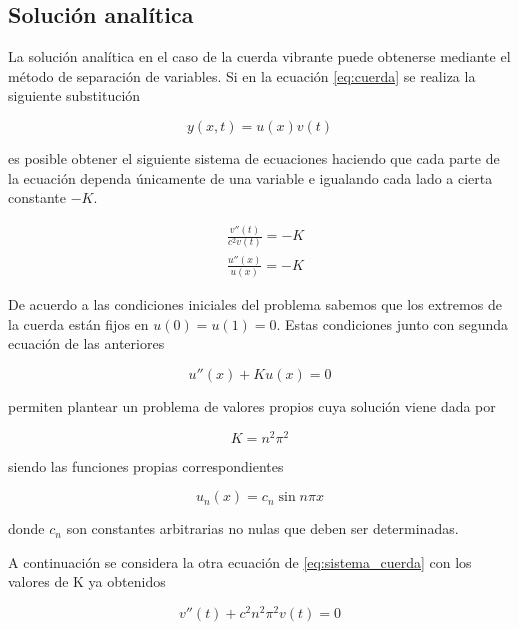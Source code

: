 \documentclass[11pt]{article}
\begin{document}
\subsection{Solución analítica}
\label{sec:sol_analitica}
La solución analítica en el caso de la cuerda vibrante puede obtenerse mediante el método
de separación de variables. Si en la ecuación \eqref{eq:cuerda} se realiza la siguiente
substitución

\begin{equation}
y(x,t) = u(x)v(t)
\end{equation}

es posible obtener el siguiente sistema de ecuaciones haciendo que cada parte de la ecuación
dependa únicamente de una variable e igualando cada lado a cierta constante $-K$.

\begin{subequations}
\begin{flalign}
	&\frac{v''(t)}{c^2v(t)} = -K\\
	&\frac{u''(x)}{u(x)} = -K
\end{flalign}
\label{eq:sistema_cuerda}
\end{subequations}

De acuerdo a las condiciones iniciales del problema sabemos que los extremos de la cuerda
están fijos en $u(0) = u(1) = 0$. Estas condiciones junto con segunda ecuación de las
anteriores

\begin{equation}
	u''(x) + Ku(x) = 0
\end{equation}

permiten plantear un problema de valores propios cuya solución viene dada por

\begin{equation}
	K = n^2\pi^2
\end{equation}

siendo las funciones propias correspondientes

\begin{equation}
	u_n(x) = c_n\sin{n\pi{x}}
\end{equation}

donde $c_n$ son constantes arbitrarias no nulas que deben ser determinadas.

A continuación se considera la otra ecuación de \eqref{eq:sistema_cuerda} con los
valores de K ya obtenidos

\begin{equation}
	v''(t) + c^2n^2\pi^2v(t) = 0
\end{equation}
 
\end{document}
